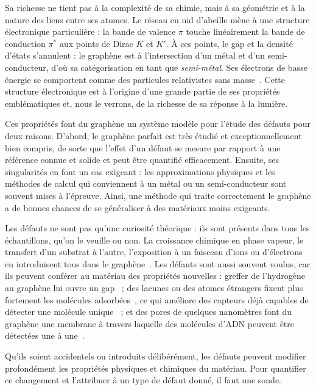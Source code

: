 Sa richesse ne tient pas à la complexité de sa chimie, mais à sa géométrie et à la nature des liens entre ses atomes. Le réseau en nid d'abeille mène à une structure électronique particulière : la bande de valence $\pi$ touche linéairement la bande de conduction $\pi^*$ aux points de Dirac $K$ et $K'$. À ces points, le gap et la densité d'états s'annulent : le graphène est à l'intersection d'un métal et d'un semi-conducteur, d'où sa catégorisation en tant que \textit{semi-métal}. Ses électrons de basse énergie se comportent comme des particules relativistes sans masse~\cite{castronetoElectronicPropertiesGraphene2009}. Cette structure électronique est à l'origine d'une grande partie de ses propriétés emblématiques et, nous le verrons, de la richesse de sa réponse à la lumière.

Ces propriétés font du graphène un système modèle pour l'étude des défauts pour deux raisons. D'abord, le graphène parfait est très étudié et exceptionnellement bien compris, de sorte que l'effet d'un défaut se mesure par rapport à une référence connue et solide et peut être quantifié efficacement. Ensuite, ses singularités en font un cas exigeant : les approximations physiques et les méthodes de calcul qui conviennent à un métal ou un semi-conducteur sont souvent mises à l'épreuve. Ainsi, une méthode qui traite correctement le graphène a de bonnes chances de se généraliser à des matériaux moins exigeants.


Les défauts ne sont pas qu'une curiosité théorique : ils sont présents dans tous les échantillons, qu'on le veuille ou non. La croissance chimique en phase vapeur, le transfert d'un substrat à l'autre, l'exposition à un faisceau d'ions ou d'électrons en introduisent tous dans le graphène~\cite{banhartStructuralDefectsGraphene2011}. Les défauts sont aussi souvent voulus, car ils peuvent conférer au matériau des propriétés nouvelles : greffer de l'hydrogène au graphène lui ouvre un gap~\cite{eliasControlGraphenesProperties2009} ; des lacunes ou des atomes étrangers fixent plus fortement les molécules adsorbées~\cite{zhangImprovingGasSensing2009}, ce qui améliore des capteurs déjà capables de détecter une molécule unique~\cite{schedinDetectionIndividualGas2007} ; et des pores de quelques nanomètres font du graphène une membrane à travers laquelle des molécules d'ADN peuvent être détectées une à une~\cite{garajGrapheneSubnanometreTranselectrode2010}.

Qu'ils soient accidentels ou introduits délibérément, les défauts peuvent modifier profondément les propriétés physiques et chimiques du matériau. Pour quantifier ce changement et l'attribuer à un type de défaut donné, il faut une sonde.

